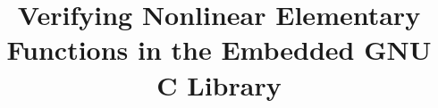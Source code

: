\documentclass{acm_proc_article-sp}
\begin{document}
\title{Verifying Nonlinear Elementary Functions in the Embedded GNU C Library}

\maketitle
\begin{abstract}

\end{abstract}












\newpage


\end{document}

